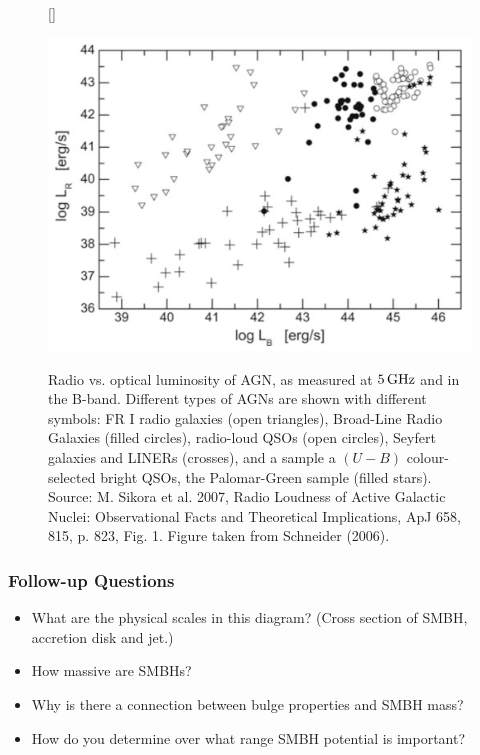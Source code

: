 \documentclass[a4paper,10pt]{article}
\begin{document}
\begin{figure}[h]
    [\FBwidth]
    {\caption{\footnotesize{Radio vs. optical luminosity of AGN, as measured at $5\,{\rm GHz}$ and in the B-band. Different types of AGNs are shown with different symbols: FR I radio galaxies (open triangles), Broad-Line Radio Galaxies (filled circles), radio-loud QSOs (open circles), Seyfert galaxies and LINERs (crosses), and a sample a $(U-B)$ colour-selected bright QSOs, the Palomar-Green sample (filled stars). Source: M. Sikora et al. 2007, Radio Loudness of Active Galactic Nuclei: Observational Facts and Theoretical Implications, ApJ 658, 815, p. 823, Fig. 1. Figure taken from Schneider (2006).}}
    \label{fig:qsoradiovsoptical}}
    {\includegraphics[width=12cm]{figures/QSO_radiovsoptical.png}}
\end{figure}

\subsubsection{Follow-up Questions}

\begin{itemize}
    \item What are the physical scales in this diagram? (Cross section of SMBH, accretion disk and jet.)
    \item How massive are SMBHs?
    \item Why is there a connection between bulge properties and SMBH mass?
    \item How do you determine over what range SMBH potential is important?
\end{itemize}
\end{document}
